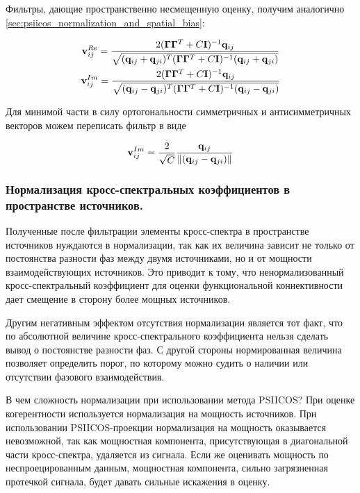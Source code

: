 Фильтры, дающие пространственно несмещенную оценку, получим аналогично \ref{sec:psiicos_normalization_and_spatial_bias}:

\begin{gather}
    \mathbf{v}_{ij}^{Re} = \frac{2(\mathbf{\Gamma}\mathbf{\Gamma}^T + C\mathbf{I})^{-1}\mathbf{q}_{ij}}
    {\sqrt{(\mathbf{q}_{ij} + \mathbf{q}_{ji})^T(\mathbf{\Gamma}\mathbf{\Gamma}^T + C\mathbf{I})^{-1}(\mathbf{q}_{ij} + \mathbf{q}_{ji})}}\\
    \mathbf{v}_{ij}^{Im} = \frac{2(\mathbf{\Gamma}\mathbf{\Gamma}^T + C\mathbf{I})^{-1}\mathbf{q}_{ij}}
    {\sqrt{(\mathbf{q}_{ij} - \mathbf{q}_{ji})^T(\mathbf{\Gamma}\mathbf{\Gamma}^T + C\mathbf{I})^{-1}(\mathbf{q}_{ij} - \mathbf{q}_{ji})}}
\end{gather}

Для минимой части в силу ортогональности симметричных и антисимметричных векторов можем переписать фильтр в виде

\begin{equation}
    \mathbf{v}_{ij}^{Im} = \frac{2}{\sqrt{C}} \frac{\mathbf{q}_{ij}}{\left\lVert(\mathbf{q}_{ij} - \mathbf{q}_{ji})\right\rVert}
\end{equation}

\subsubsection{Нормализация кросс-спектральных коэффициентов в пространстве источников.}

Полученные после фильтрации элементы кросс-спектра в пространстве источников нуждаются
в нормализации, так как их величина зависит не только от постоянства разности фаз между
двумя источниками, но и от мощности взаимодействующих источников. Это приводит к тому, что ненормализованный
кросс-спектральный коэффициент для оценки функциональной коннективности дает смещение
в сторону более мощных источников.

Другим негативным эффектом отсутствия нормализации является тот факт, что
по абсолютной величине кросс-спектрального коэффициента нельзя сделать вывод
о постоянстве разности фаз. С другой стороны нормированная величина позволяет
определить порог, по которому можно судить о наличии или отсутствии фазового взаимодействия.

В чем сложность нормализации при использовании метода PSIICOS?\@
При оценке когерентности используется нормализация на мощность источников. При
использовании PSIICOS-проекции нормализация на мощность оказывается
невозможной, так как мощностная компонента, присутствующая в диагональной части
кросс-спектра, удаляется из сигнала. Если же оценивать мощность по неспроецированным
данным, мощностная компонента, сильно загрязненная протечкой сигнала, будет
давать сильные искажения в оценку.

